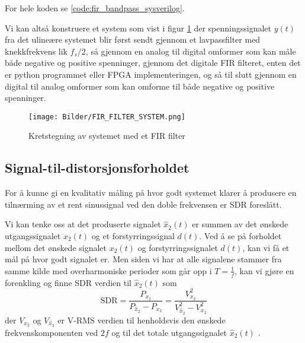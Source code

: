 For hele koden se \ref{code:fir_bandpass_sysverilog}.

Vi kan altså konstruere et system som vist i figur \ref{fig:fir_filter_system_overview} der spenningssignalet $y(t)$ fra det ulineære systemet 
blir først sendt gjennom et lavpassfilter med knekkfrekvens lik $f_s/2$, så gjennom en analog til digital omformer som kan måle både negative og positive spenninger,
gjennom det digitale FIR filteret, enten det er python programmet eller FPGA implementeringen, og så til slutt gjennom en digital til analog omformer som kan omforme til 
både negative og positive spenninger.
\begin{figure}[H]
    \centering
    \texttt{[image: Bilder/FIR\_FILTER\_SYSTEM.png]}
    \caption{Kretstegning av systemet med et FIR filter}
    \label{fig:fir_filter_system_overview} 
\end{figure}


\subsection{Signal-til-distorsjonsforholdet}
For å kunne gi en kvalitativ måling på hvor godt systemet klarer å produsere en tilnærming 
av et rent sinussignal ved den doble frekvensen er SDR foreslått. 

Vi kan tenke oss at det produserte signalet $\hat{x}_2(t)$ er summen av det ønskede utgangssignalet $x_2(t)$
og et forstyrringssignal $d(t)$. Ved å se på forholdet mellom det ønskede signalet $x_2(t)$ og forstyrringssignalet 
$d(t)$, kan vi få et mål på hvor godt signalet er. Men siden vi har at alle signalene stammer fra samme kilde med overharmoniske 
perioder som går opp i $T = \frac{1}{f}$, kan vi gjøre en forenkling og finne SDR verdien til $\hat{x}_2(t)$ som 
\[
    \text{SDR} = \frac{P_{x_2}}{P_{\hat{x}_2} - P_{x_2}} = \frac{V_{x_2}^2}{V_{\hat{x}_2}^2 - V_{x_2}^2}
\]
der $V_{x_2}$ og $V_{\hat{x}_2}$ er V-RMS verdien til henholdsvis den ønskede frekvenskomponenten ved $2f$ og til det totale utgangssignalet 
$\hat{x}_2(t)$ \cite{frekvens_mul}.

